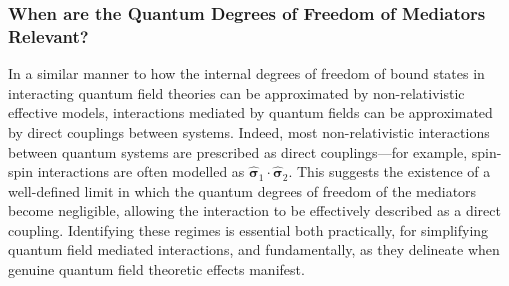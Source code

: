 \documentclass[letterpaper,12pt,titlepage,oneside,final]{book}
\begin{document}




\subsubsection*{When are the Quantum Degrees of Freedom of Mediators Relevant?}

In a similar manner to how the internal degrees of freedom of bound states in interacting quantum field theories can be approximated by non-relativistic effective models, interactions mediated by quantum fields can be approximated by direct couplings between systems. Indeed, most non-relativistic interactions between quantum systems are prescribed as direct couplings---for example, spin-spin interactions are often modelled as $\hat{\bm \sigma}_1 \cdot \hat{\bm \sigma}_2$. This suggests the existence of a well-defined limit in which the quantum degrees of freedom of the mediators become negligible, allowing the interaction to be effectively described as a direct coupling. Identifying these regimes is essential both practically, for simplifying quantum field mediated interactions, and fundamentally, as they delineate when genuine quantum field theoretic effects manifest.
\end{document}

